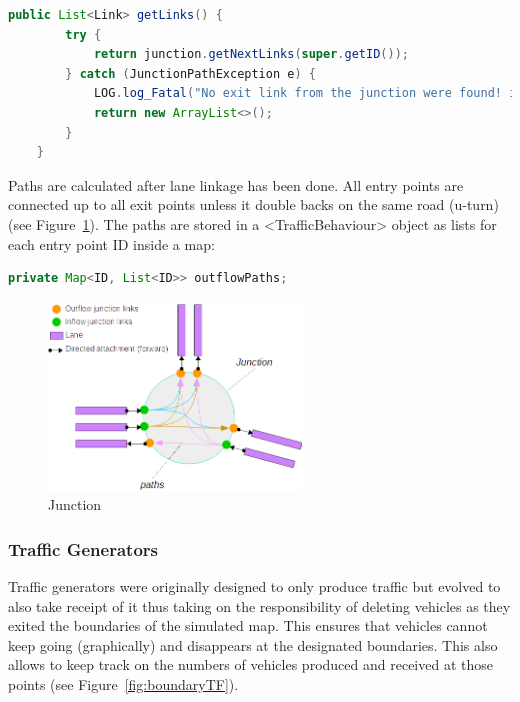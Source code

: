 \begin{lstlisting}[language=Java]
    public List<Link> getLinks() {
        try {
            return junction.getNextLinks(super.getID());
        } catch (JunctionPathException e) {
            LOG.log_Fatal("No exit link from the junction were found! i.e.: Car is stuck!");
            return new ArrayList<>();
        }
    }
\end{lstlisting}

Paths are calculated after lane linkage has been done. All entry points are connected up to all exit points unless it double backs on the same road (u-turn) (see Figure~\ref{fig:junction}). The paths are stored in a <TrafficBehaviour> object as lists for each entry point ID inside a map:

\begin{lstlisting}[language=Java]
	private Map<ID, List<ID>> outflowPaths;
\end{lstlisting}

\begin{figure}[!h]
	\vspace{1.5em}
  	\caption{Junction}
  	\label{fig:junction}
  	\centering
	\includegraphics[width=0.6\textwidth]{figs/graphConstruction/Junction.png}
  	\vspace{1.5em}
\end{figure}

\subsubsection{Traffic Generators}

Traffic generators were originally designed to only produce traffic but evolved to also take receipt of it thus taking on the responsibility of deleting vehicles as they exited the boundaries of the simulated map. This ensures that vehicles cannot keep going (graphically) and disappears at the designated boundaries. This also allows to keep track on the numbers of vehicles produced and received at those points (see Figure~\ref{fig:boundaryTF}).

